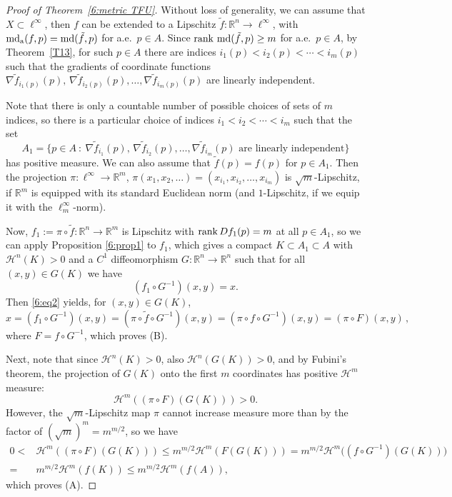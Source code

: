 \documentclass[12pt,leqno]{amsart}
\theoremstyle{definition}
\newcommand{\bbbr}{\mathbb R}
\def\H{{\mathcal H}}
\def\rank{{\rm rank\,}}
\def\md{\operatorname{md}}
\def\apmd{\operatorname{md_{\rm a}}}
\numberwithin{theorem}{section} \numberwithin{equation}{section}
\begin{document}
\begin{proof}[Proof of Theorem~\ref{6:metric TFU}]
Without loss of generality, we can assume that $X\subset \ell^\infty$, then  $f$ can be extended to a Lipschitz $\tilde{f}:\bbbr^n\to \ell^\infty$, with $\apmd (f,p)=\md(\tilde{f},p)$ for a.e.\ $p\in A$.
Since $\rank \md(\tilde{f},p)\geq m$ for a.e.\ $p\in A$, by Theorem~\ref{T13},  for such $p\in A$ there are indices $i_1(p)<i_2(p)<\cdots<i_m(p)$ such that the gradients of coordinate functions $\nabla \tilde{f}_{i_1(p)}(p),\,\nabla \tilde{f}_{i_2(p)}(p),\ldots, \nabla \tilde{f}_{i_m(p)}(p) $ are linearly independent.

Note that there is only a countable number of possible choices of sets of $m$ indices, so there is a particular choice of indices $i_1<i_2<\cdots<i_m$ such that the set
$$
A_1=\{p\in A~:~\nabla \tilde{f}_{i_1}(p),\,\nabla \tilde{f}_{i_2}(p),\ldots, \nabla \tilde{f}_{i_m}(p) \text{ are linearly independent} \}
$$
has positive measure.
We can also assume that $\tilde{f}(p)=f(p)$ for $p\in A_1$.
Then the projection $\pi:\ell^\infty\to\bbbr^m$, $\pi(x_1,x_2,\ldots)=(x_{i_1},x_{i_2},\ldots,x_{i_m})$ is $\sqrt{m}$-Lipschitz, if $\bbbr^m$ is equipped with its standard Euclidean norm (and $1$-Lipschitz, if we equip it with the $\ell^\infty_m$-norm).

Now, $f_1:=\pi\circ \tilde{f}:\bbbr^n\to\bbbr^m$ is Lipschitz with $\rank Df_1(p)=m$ at all $p\in A_1$, so we can apply Proposition \ref{6:prop1} to $f_1$, which gives a compact $K\subset A_1\subset A$ with $\H^n(K)>0$ and a $C^1$ diffeomorphism $G:\bbbr^n\to\bbbr^n$ such that for all $(x,y)\in G(K)$ we have
\begin{equation}\label{6:eq2}
(f_1\circ G^{-1})(x,y)=x.
\end{equation}
Then \eqref{6:eq2} yields, for $(x,y)\in G(K)$,
$$
x=(f_1\circ G^{-1})(x,y)=(\pi\circ \tilde{f}\circ G^{-1})(x,y)=(\pi\circ f\circ G^{-1})(x,y)=(\pi\circ F)(x,y)\,,
$$
where $F=f\circ G^{-1}$, which proves (B).

Next, note that since $\H^n(K)>0$, also $\H^n(G(K))>0$, and by Fubini's theorem,  the projection of $G(K)$ onto the first $m$ coordinates has positive $\H^m$ measure:
$$
\H^m((\pi\circ F)(G(K)))>0.
$$
However, %
the $\sqrt{m}$-Lipschitz map $\pi$ cannot increase measure more than by the factor of $(\sqrt{m})^m=m^{m/2}$, so we have
\begin{equation*}
\begin{split}
0<&\H^m((\pi\circ F)(G(K)))\leq m^{m/2}\H^m(F(G(K)))=m^{m/2} \H^m\big((f\circ G^{-1})(G(K))\big)\\=&m^{m/2}\H^m(f(K))\leq m^{m/2} \H^m(f(A)),
\end{split}
\end{equation*}
which proves (A).


\end{proof}
\end{document}
